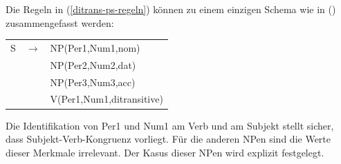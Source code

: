 \noindent
Die Regeln in (\ref{ditrans-ps-regeln}) können zu einem einzigen Schema wie in () zusammengefasst werden:
\ea
\label{ditrans-schema}
\begin{tabular}[t]{@{}l@{ }l@{ }l}
S  & $\to$ & NP({Per1},{Num1},{nom}) \\
   &       & NP(Per2,Num2,{dat})\\
   &       & NP(Per3,Num3,{acc})\\
   &       & V({Per1},{Num1},ditransitive)\\
\end{tabular}
\z
Die Identifikation von Per1 und Num1 am Verb und am Subjekt stellt sicher, dass Subjekt-Verb-Kongruenz vorliegt.
Für die anderen NPen sind die Werte dieser Merkmale irrelevant. Der Kasus dieser NPen wird explizit festgelegt.



